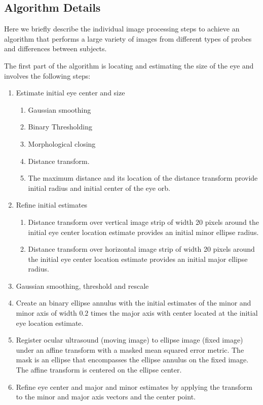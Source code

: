 \documentclass{llncs}
\begin{document}
\subsection{Algorithm Details}
Here we briefly describe the individual image processing steps to achieve an
algorithm that performs a large variety of images from different types of probes
and differences between subjects.

The first part of the algorithm is locating and estimating the size of the eye
and involves the following steps:
\begin{enumerate}
\item Estimate initial eye center and size
  \begin{enumerate}
  \item Gaussian smoothing
  \item Binary Thresholding
  \item Morphological closing
  \item Distance transform. 
  \item The maximum distance and its location of the distance transform provide
        initial radius and initial center of the eye orb. 
  \end{enumerate}
\item Refine initial estimates
  \begin{enumerate}
  \item Distance transform over vertical image strip of width 20 pixels
        around the initial eye center location estimate provides an initial
        minor ellipse radius.
  \item Distance transform over horizontal image strip of width 20 pixels 
        around the initial eye center location estimate provides an initial major
        ellipse radius.
  \end{enumerate}
\item Gaussian smoothing, threshold and rescale
\item Create an binary ellipse annulus with the initial estimates of the minor and
      minor axis of width $0.2$ times the major axis with center located at the
      initial eye location estimate.
\item Register ocular ultrasound (moving image) to ellipse image (fixed image)
      under an affine transform with a masked mean squared error metric. The
      mask is an ellipse that encompasses the ellipse annulus on the fixed
      image. The affine transform is centered on the ellipse center.
\item Refine eye center and major and minor estimates by applying the transform to
      the minor and major axis vectors and the center point.
\end{enumerate}
\end{document}
